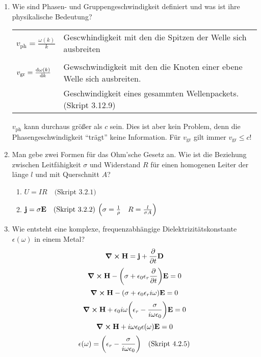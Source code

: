 \documentclass{scrartcl}
\newcommand{\sref}[1]{(Skript #1)}
\newcommand{\smref}[1]{\quad\text{(Skript #1)}}
\begin{document}
\begin{enumerate}
    \item Wie sind Phasen- und Gruppengeschwindigkeit definiert und was ist
          ihre physikalische Bedeutung?
          \begin{center}
            \begin{tabular}{ll}
              $v_{\text{ph}}=\frac{\omega(k)}{k}$ 
                        &Gescwhindigkeit mit 
                         den die Spitzen der Welle sich ausbreiten 
                         \\\\
              $v_{\text{gr}}=\dv{\omega(k)}{k}$
                        &Gewschwindigkeit mit
                         den die Knoten einer ebene Welle sich ausbreiten.\\
                        &Geschwindigkeit eines gesammten Wellenpackets.
                        \sref{3.12.9}\\
            \end{tabular}
          \end{center}
          $v_{\text{ph}}$ kann durchaus größer als $c$ sein. Dies ist aber
          kein Problem, denn die Phasengeschwindigkeit ``trägt'' keine
          Information. Für $v_{\text{gr}}$ gilt immer $v_{\text{gr}}\le c$!

    \item Man gebe zwei Formen für das Ohm'sche Gesetz an. Wie ist die
          Beziehung zwischen Leitfähigkeit $\sigma$ und Widerstand $R$ 
          für einen homogenen Leiter der länge $l$ und mit 
          Querschnitt $A$?
          \begin{enumerate}
            \item $U=IR\smref{3.2.1}$
            \item $\vb j= \sigma \vb E\smref{3.2.2}$ 
              $\qty(\sigma=\frac{1}{\rho}\quad R=\frac{l}{\sigma A})$
          \end{enumerate}

    \item Wie entsteht eine komplexe, frequenzabhängige 
          Dielektrizitätskonstante $\epsilon(\omega)$ in einem Metal?
          $$\curl \vb H = \vb j + \pdv{t}\vb D$$
          $$\curl \vb H -\qty(\sigma +\epsilon_0\epsilon_r\pdv{t})\vb E=0$$
          $$\curl \vb H -\qty(\sigma +\epsilon_0\epsilon_ri\omega)\vb E=0$$
          $$\curl \vb H +\epsilon_0 i\omega
          \qty(\epsilon_r-\frac{\sigma}{i\omega\epsilon_0})\vb E=0$$
          $$\curl \vb H +i\omega\epsilon_0 \epsilon(\omega)\vb E=0$$
          $$\epsilon(\omega)=\qty(\epsilon_r-\frac{\sigma}
          {i\omega\epsilon_0})\smref{4.2.5}$$


\end{enumerate}
\end{document}
